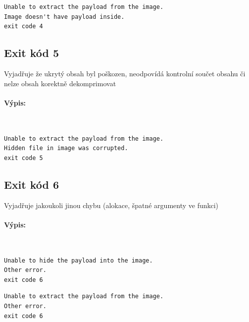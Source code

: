 \documentclass[12pt]{report}
\begin{document}
    \begin{mdframed}
        \begin{verbatim}
Unable to extract the payload from the image.
Image doesn't have payload inside.
exit code 4
        \end{verbatim}
    \end{mdframed}

    \subsection{Exit kód 5}
    Vyjadřuje že ukrytý obsah byl poškozen, neodpovídá kontrolní součet obsahu
    či nelze obsah korektně dekomprimovat\\

    \paragraph{Výpis:}\\

    \begin{mdframed}
        \begin{verbatim}
Unable to extract the payload from the image.
Hidden file in image was corrupted.
exit code 5
        \end{verbatim}
    \end{mdframed}

    \subsection{Exit kód 6}
    Vyjadřuje jakoukoli jinou chybu (alokace, špatné argumenty ve funkci)\\

    \paragraph{Výpis:}\\

    \begin{mdframed}
        \begin{verbatim}
Unable to hide the payload into the image.
Other error.
exit code 6
        \end{verbatim}
    \end{mdframed}

        \begin{mdframed}
            \begin{verbatim}
Unable to extract the payload from the image.
Other error.
exit code 6
            \end{verbatim}
        \end{mdframed}
\end{document}
